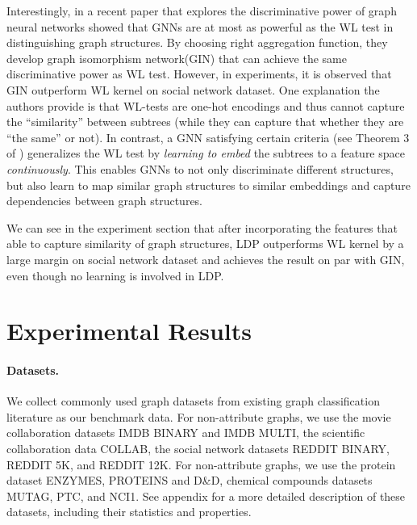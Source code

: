 \documentclass[11pt,onecolumn]{article}
\newcommand{\DOM}       {{LDP}\xspace}
\begin{document}
Interestingly, in a recent paper \cite{xu2018powerful} that explores the discriminative power of graph neural networks showed that GNNs are at most as powerful as the WL test in distinguishing graph structures. By choosing right aggregation function, they develop graph isomorphism network(GIN) that can achieve the same discriminative power as WL test. However, in experiments, it is observed that GIN outperform WL kernel on social network dataset. One explanation the authors provide is that WL-tests are one-hot encodings and thus cannot capture the ``similarity'' between subtrees (while they can capture that whether they are ``the same'' or not). In contrast, a GNN satisfying certain criteria (see Theorem 3 of \cite{xu2018powerful}) generalizes the WL test by \textit{learning to embed} the subtrees to a feature space \emph{continuously}. This enables GNNs to not only discriminate different structures, but also learn to map similar graph structures to similar embeddings and capture dependencies between graph structures.   

We can see in the experiment section that after incorporating the features that able to capture similarity of graph structures, \DOM{} outperforms WL kernel by a large margin on social network dataset and achieves the result on par with GIN, even though no learning is involved in \DOM{}. 

\section{Experimental Results}

\paragraph{Datasets.} We collect commonly used graph datasets from existing graph classification literature as our benchmark data. 
For non-attribute graphs, we use the movie collaboration datasets IMDB BINARY and IMDB MULTI,  the scientific collaboration data COLLAB, the social network datasets REDDIT BINARY, REDDIT 5K, and REDDIT 12K. For non-attribute graphs, we use the protein dataset ENZYMES, PROTEINS and D\&D, chemical compounds datasets MUTAG, PTC, and NCI1. See appendix for a more detailed description of these datasets, including their statistics and properties. 
\end{document}
